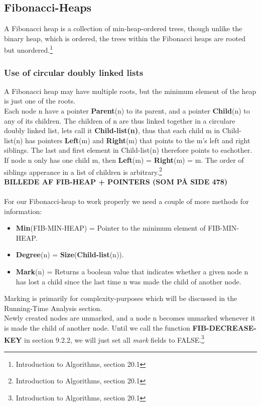 \documentclass[11pt]{article}
\begin{document}
\subsection{Fibonacci-Heaps}
A Fibonacci heap is a collection of min-heap-ordered trees, though unlike the binary heap, which is ordered, the trees within the Fibonacci heaps are rooted but unordered.\footnote{Introduction to Algorithms, section 20.1}\\
\subsubsection{Use of circular doubly linked lists}
A Fibonacci heap may have multiple roots, but the minimum element of the heap is just one of the roots.\\
Each node n have a pointer \textbf{Parent}(n) to its parent, and a pointer \textbf{Child}(n) to any of its children. The children of n are thus linked together in a circulare doubly linked list, lets call it \textbf{Child-list(n)}, thus that each child m in Child-list(n) has pointers \textbf{Left}(m) and \textbf{Right}(m) that points to the m's left and right siblings. The last and first element in Child-list(n) therefore points to eachother. If node n only has one child m, then \textbf{Left}(m) = \textbf{Right}(m) = m. The order of siblings apperance in a list of children is arbitrary.\footnote{Introduction to Algorithms, section 20.1}\\
\textbf{BILLEDE AF FIB-HEAP + POINTERS (SOM PÅ SIDE 478)}\\\\
For our Fibonacci-heap to work properly we need a couple of more methods for information:
\begin{itemize}
\item \textbf{Min}(FIB-MIN-HEAP) = Pointer to the minimum element of FIB-MIN-HEAP.
\item \textbf{Degree}(n) = \textbf{Size}(\textbf{Child-list}(n)).
\item \textbf{Mark}(n) = Returns a boolean value that indicates whether a given node n has lost a child since the last time n was made the child of another node.
\end{itemize}
Marking is primarily for complexity-purposes which will be discussed in the Running-Time Analysis section.\\
Newly created nodes are unmarked, and a node n becomes unmarked whenever it is made the child of another node. Until we call the function \textbf{FIB-DECREASE-KEY} in section 9.2.2, we will just set all \textit{mark} fields to FALSE.\footnote{Introduction to Algorithms, section 20.1}\\
\newpage
\end{document}
